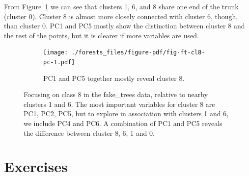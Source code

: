 \documentclass[
  letterpaper,
]{book}
\begin{document}
From Figure~\ref{fig-ft-cl2} we can see that clusters 1, 6, and 8 share
one end of the trunk (cluster 0). Cluster 8 is almost more closely
connected with cluster 6, though, than cluster 0. PC1 and PC5 mostly
show the distinction between cluster 8 and the rest of the points, but
it is clearer if more variables are used.

\begin{figure}

\begin{minipage}[t]{0.50\linewidth}

{\centering 

}

\end{minipage}%
%
\begin{minipage}[t]{0.50\linewidth}

{\centering 

\begin{figure}

{\centering \texttt{[image: ./forests\_files/figure-pdf/fig-ft-cl8-pc-1.pdf]}

}

\caption{PC1 and PC5 together mostly reveal cluster 8.}

\end{figure}

}

\end{minipage}%

\caption{\label{fig-ft-cl2}Focusing on class 8 in the fake\_trees data,
relative to nearby clusters 1 and 6. The most important variables for
cluster 8 are PC1, PC2, PC5, but to explore in association with clusters
1 and 6, we include PC4 and PC6. A combination of PC1 and PC5 reveals
the difference between cluster 8, 6, 1 and 0.}

\end{figure}

\hypertarget{exercises-12}{%
\section*{Exercises}\label{exercises-12}}

\end{document}
